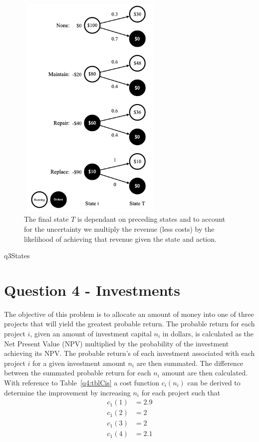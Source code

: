 \documentclass[a4paper,11pt]{article}
\begin{document}
\begin{figure}[h]
\includegraphics[width=7cm, height=11cm]{q3States.png}
\centering
\caption{The final state $T$ is dependant on preceding states and to account for the uncertainty we multiply the revenue (less costs) by the likelihood of achieving that revenue given the state and action.}
\label{q3:Fig}
\end{figure}

q3States


\newpage
\section{Question 4 - Investments}
The objective of this problem is to allocate an amount of money into one of three projects that will yield the greatest probable return. The probable return for each project $i$, given an amount of investment capital $n_i$ in dollars, is calculated as the Net Present Value (NPV) multiplied by the probability of the investment achieving its NPV. The probable return's of each investment associated with each project $i$ for a given investment amount $n_i$ are then summated. The difference between the summated probable return for each $n_i$ amount are then calculated. With reference to Table~\ref{q4:tblCis} a cost function $c_i(n_i)$ can be derived to determine the improvement by increasing $n_i$ for each project such that
\begin{align}
	c_1(1) &= 2.9 \\
	c_1(2) &= 2 \\
	c_1(3) &= 2 \\
	c_1(4) &= 2.1
\end{align}
\end{document}
